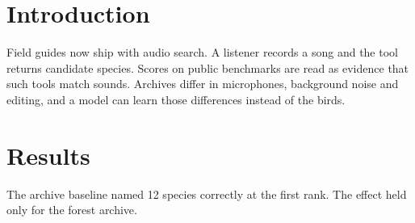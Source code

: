 \begin{abstract}
Song libraries are searched by people who need to name a bird from a field recording. We ask whether retrieval scores on such a library measure matching sounds to species or only matching recordings to the archive they came from. We built a small benchmark of forty recordings and tested three audio models against a baseline that sees only the archive label. One model beat that baseline, and only on a minority of queries.
\end{abstract}
\section{Introduction}
Field guides now ship with audio search. A listener records a song and the tool returns candidate species. Scores on public benchmarks are read as evidence that such tools match sounds. Archives differ in microphones, background noise and editing, and a model can learn those differences instead of the birds.
\section{Results}
The archive baseline named 12 species correctly at the first rank. The effect held only for the forest archive.
